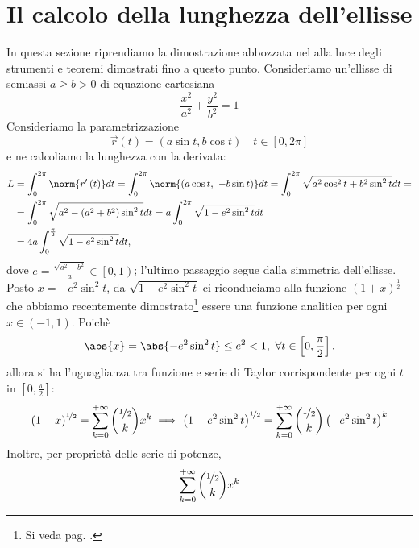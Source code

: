 \section{Il calcolo della lunghezza dell'ellisse}\label{lunghezzaellisse}
In questa sezione riprendiamo la dimostrazione abbozzata nel  alla luce degli strumenti e teoremi dimostrati fino a questo punto.
Consideriamo un'ellisse di semiassi $a\geq b>0$ di equazione cartesiana
\begin{equation*}
	\frac{x^2}{a^2}+\frac{y^2}{b^2}=1
\end{equation*}
Consideriamo la parametrizzazione
\begin{equation*}
	\vec{r}\left(t\right)=\left(a\sin t,b\cos t\right)\quad t\in\left[0, 2\pi\right]
\end{equation*}
e ne calcoliamo la lunghezza con la derivata:
\begin{align*}
L&=\int_{0}^{2\pi}\norm{\vec{r}'\left(t\right)}dt=\int_{0}^{2\pi}\norm{\left(a\cos t,\ -b\sin t\right)}dt=\int_{0}^{2\pi}\sqrt{a^2\cos^2t+b^2\sin^2t}dt=\\
&=\int_{0}^{2\pi}\sqrt{a^2-\left(a^2+b^2\right)\sin^2t}dt=a\int_{0}^{2\pi}\sqrt{1-e^2\sin^2t}dt\\
&=4a\int_{0}^{\frac{\pi}{2}}\sqrt{1-e^2\sin^2t}dt,
\end{align*} 
dove $e=\frac{\sqrt{a^2-b^2}}{a}\in\left[0,1\right)$; l'ultimo passaggio segue dalla simmetria dell'ellisse.\\
Posto $x=-e^2\sin^2t$, da $\sqrt{1-e^2\sin^2t}$ ci riconduciamo alla funzione $\left(1+x\right)^{\frac{1}{2}}$ che abbiamo recentemente dimostrato\footnote{Si veda pag. \pageref{funzionianaliticheesempiopotenza}.} essere una funzione analitica per ogni $x\in\left(-1,1\right)$. Poichè
\begin{equation*}
	\abs{x}=\abs{-e^2\sin^2t}\leq e^2<1,\ \forall t\in\left[0,\frac{\pi}{2}\right],
\end{equation*}
allora si ha l'uguaglianza tra funzione e serie di Taylor corrispondente per ogni $t$ in $\left[0,\frac{\pi}{2}\right]$:
\begin{equation*}
	\left(1+x\right)^{\nicefrac{1}{2}}=\sum_{k=0}^{+\infty}\binom{\nicefrac{1}{2}}{k}x^k\implies\left(1-e^2\sin^2t\right)^{\nicefrac{1}{2}}=\sum_{k=0}^{+\infty}\binom{\nicefrac{1}{2}}{k}\left(-e^2\sin^2t\right)^k
\end{equation*}
Inoltre, per proprietà delle serie di potenze,
\begin{equation*}
	\sum_{k=0}^{+\infty}\binom{\nicefrac{1}{2}}{k}x^k
\end{equation*}
